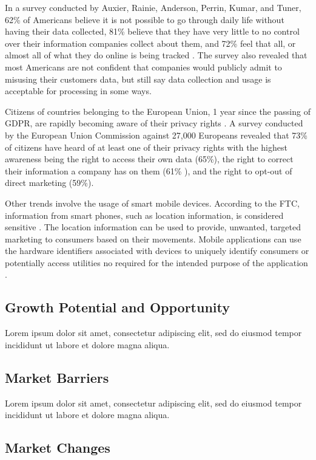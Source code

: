 In a survey conducted by Auxier, Rainie, Anderson, Perrin, Kumar, and Tuner, 62\% of Americans believe it is not possible to go through daily life without having their data collected, 81\% believe that they have very little to no control over their information companies collect about them, and 72\% feel that all, or almost all of what they do online is being tracked \cite{pewresearch.2019}. The survey also revealed that most Americans are not confident that companies would publicly admit to misusing their customers data, but still say data collection and usage is acceptable for processing in some ways.

Citizens of countries belonging to the European Union, 1 year since the passing of GDPR, are rapidly becoming aware of their privacy rights \cite{eucomm.2019}. A survey conducted by the European Union Commission against 27,000 Europeans revealed that 73\% of citizens have heard of at least one of their privacy rights with the highest awareness being the right to access their own data (65\%), the right to correct their information a company has on them (61\% ), and the right to opt-out of direct marketing (59\%).

Other trends involve the usage of smart mobile devices. According to the FTC, information from smart phones, such as location information, is considered sensitive \cite{ftc.mobile.2012}. The location information can be used to provide, unwanted, targeted marketing to consumers based on their movements. Mobile applications can use the hardware identifiers associated with devices to uniquely identify consumers or potentially access utilities no required for the intended purpose of the application \cite{tama.mobile.2012}.

\subsection{Growth Potential and Opportunity}

Lorem ipsum dolor sit amet, consectetur adipiscing elit, sed do eiusmod tempor incididunt ut labore et dolore magna aliqua.

\subsection{Market Barriers}

Lorem ipsum dolor sit amet, consectetur adipiscing elit, sed do eiusmod tempor incididunt ut labore et dolore magna aliqua.

\subsection{Market Changes}

